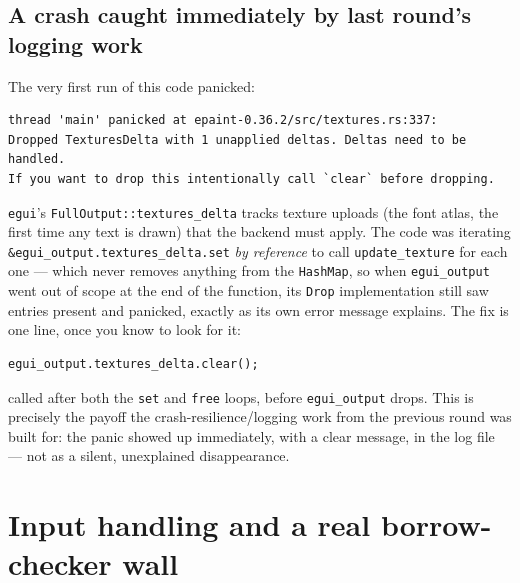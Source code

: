 \documentclass[11pt]{article}
\begin{document}
\subsection{A crash caught immediately by last round's logging work}
The very first run of this code panicked:
\begin{lstlisting}
thread 'main' panicked at epaint-0.36.2/src/textures.rs:337:
Dropped TexturesDelta with 1 unapplied deltas. Deltas need to be handled.
If you want to drop this intentionally call `clear` before dropping.
\end{lstlisting}
\texttt{egui}'s \texttt{FullOutput::textures\_delta} tracks texture uploads (the font atlas,
the first time any text is drawn) that the backend must apply. The code was iterating
\texttt{\&egui\_output.textures\_delta.set} \emph{by reference} to call
\texttt{update\_texture} for each one — which never removes anything from the
\texttt{HashMap}, so when \texttt{egui\_output} went out of scope at the end of the
function, its \texttt{Drop} implementation still saw entries present and panicked, exactly
as its own error message explains. The fix is one line, once you know to look for it:
\begin{lstlisting}
egui_output.textures_delta.clear();
\end{lstlisting}
called after both the \texttt{set} and \texttt{free} loops, before \texttt{egui\_output}
drops. This is precisely the payoff the crash-resilience/logging work from the previous
round was built for: the panic showed up immediately, with a clear message, in the log
file — not as a silent, unexplained disappearance.

\section{Input handling and a real borrow-checker wall}
\label{sec:input}
\end{document}
